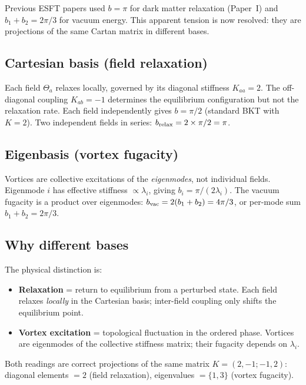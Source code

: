\documentclass[twocolumn,preprintnumbers,amsmath,amssymb,prd]{revtex4-2}
\begin{document}
Previous ESFT papers used $b = \pi$ for dark matter relaxation (Paper~I) and $b_1 + b_2 = 2\pi/3$ for vacuum energy.
This apparent tension is now resolved: they are projections of the same Cartan matrix in different bases.

\subsection{Cartesian basis (field relaxation)}

Each field $\Theta_a$ relaxes locally, governed by its diagonal stiffness $K_{aa} = 2$.
The off-diagonal coupling $K_{ab} = -1$ determines the equilibrium configuration but not the relaxation rate.
Each field independently gives $b = \pi/2$ (standard BKT with $K = 2$).
Two independent fields in series: $b_{\rm relax} = 2 \times \pi/2 = \pi$.

\subsection{Eigenbasis (vortex fugacity)}

Vortices are collective excitations of the \emph{eigenmodes}, not individual fields.
Eigenmode $i$ has effective stiffness $\propto \lambda_i$, giving $b_i = \pi/(2\lambda_i)$.
The vacuum fugacity is a product over eigenmodes: $b_{\rm vac} = 2(b_1 + b_2) = 4\pi/3$, or per-mode sum $b_1 + b_2 = 2\pi/3$.

\subsection{Why different bases}

The physical distinction is:
\begin{itemize}
\item \textbf{Relaxation} = return to equilibrium from a perturbed state. Each field relaxes \emph{locally} in the Cartesian basis; inter-field coupling only shifts the equilibrium point.
\item \textbf{Vortex excitation} = topological fluctuation in the ordered phase. Vortices are eigenmodes of the collective stiffness matrix; their fugacity depends on $\lambda_i$.
\end{itemize}

Both readings are correct projections of the same matrix $K = (2,-1;-1,2)$:
diagonal elements $= 2$ (field relaxation), eigenvalues $= \{1,3\}$ (vortex fugacity).

\end{document}

